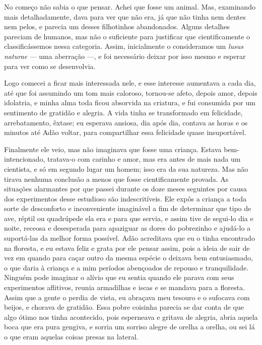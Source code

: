 No começo não sabia o que pensar. Achei que fosse um animal. Mas,
examinando mais detalhadamente, dava para ver que não era, já que não tinha nem
dentes nem pelos, e parecia um desses filhotinhos abandonados. Alguns detalhes
pareciam de humanos, mas não o suficiente para justificar que cientificamente o
classificássemos nessa categoria. Assim, inicialmente o consideramos um
\textit{lusus naturae} --- uma aberração ---, e foi necessário deixar por
isso mesmo e esperar para ver como se desenvolvia.

Logo comecei a ficar mais interessada nele, e esse interesse aumentava a cada
dia, até que foi assumindo um tom mais caloroso, tornou-se afeto, depois
amor, depois idolatria, e minha alma toda ficou absorvida na criatura, e fui
consumida por um sentimento de gratidão e alegria. A vida tinha se transformado em
felicidade, arrebatamento, êxtase; eu esperava ansiosa, dia após dia, contava as horas e
os minutos até Adão voltar, para compartilhar essa
felicidade quase insuportável.

 Finalmente ele veio, mas não imaginava que fosse uma criança. Estava
bem-intencionado, tratava-o com carinho e amor, mas era antes de mais
nada um cientista, e só em segundo lugar um homem; isso era da sua natureza. Mas não
tirava nenhuma conclusão a menos que fosse cientificamente provada. As
situações alarmantes por que passei durante os doze meses seguintes por causa dos
experimentos desse estudioso são indescritíveis. Ele expôs a criança a toda
sorte de desconforto e inconveniente imaginável a fim de determinar que tipo de
ave, réptil ou quadrúpede ela era e para que servia, e assim tive de segui-lo
dia e noite, receosa e desesperada para apaziguar as dores do pobrezinho e ajudá-lo a
suportá-las da melhor forma possível. Adão acreditava que eu o tinha encontrado na
floresta, e eu estava feliz e grata por ele pensar assim, pois a ideia de
sair de vez em quando para caçar outro da mesma espécie o deixava bem
entusiasmado, o que daria à criança e a mim períodos abençoados de repouso e
tranquilidade. Ninguém pode imaginar o alívio que eu sentia quando ele parava com
seus experimentos aflitivos, reunia armadilhas e iscas e se mandava para a
floresta. Assim que a gente o perdia de vista, eu abraçava meu tesouro e o
sufocava com beijos, e chorava de gratidão. Essa pobre coisinha parecia se dar
conta de que algo ótimo nos tinha acontecido, pois esperneava e gritava de alegria,
abria aquela boca que era pura gengiva, e sorria um sorriso alegre de orelha a
orelha, ou sei lá o que eram aquelas coisas presas na lateral.

